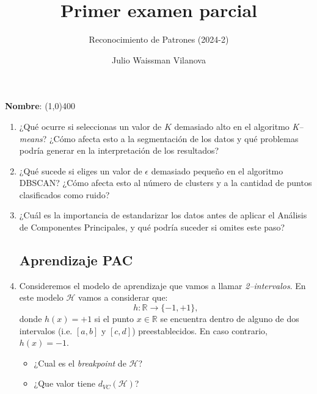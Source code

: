 \documentclass[11pt]{article}
\title{Primer examen parcial}
\author{Reconocimiento de Patrones (2024-2)}
\date{Julio Waissman Vilanova}
\begin{document}
\maketitle

\vspace{5mm}

\textbf{Nombre}: \line(1,0){400}

\vspace{9mm}


\begin{enumerate}

\subsection*{Aprendizaje no supervisado}

\item ¿Qué ocurre si seleccionas un valor de $K$ demasiado alto en el algoritmo \emph{K--means}? ¿Cómo afecta esto a la segmentación de los datos y qué problemas podría generar en la interpretación de los resultados?

\vfill

\item ¿Qué sucede si eliges un valor de $\epsilon$ demasiado pequeño en el algoritmo DBSCAN? ¿Cómo afecta esto al número de clusters y a la cantidad de puntos clasificados como ruido?

\vfill

\item ¿Cuál es la importancia de estandarizar los datos antes de aplicar el Análisis de Componentes Principales, y qué podría suceder si omites este paso?

\vfill

\newpage

\subsection*{Aprendizaje PAC}

\item Consideremos el modelo de aprendizaje que vamos a llamar \emph{2--intervalos}. En este modelo $\mathcal{H}$ vamos a considerar que:
$$
h: \mathbb{R} \to \{-1, +1\},
$$
donde $h(x) = +1$ si el punto $x \in \mathbb{R}$ se encuentra dentro de alguno de dos intervalos (i.e. $[a, b]$ y $[c, d]$) preestablecidos. En caso contrario, $h(x) = -1$.

\vspace{3mm}

\begin{itemize}
    \item ¿Cual es el \emph{breakpoint} de $\mathcal{H}$?
    \vspace{3mm}
    \item ¿Que valor tiene $d_{VC}(\mathcal{H})$?
\end{itemize}


\end{enumerate}
\end{document}
